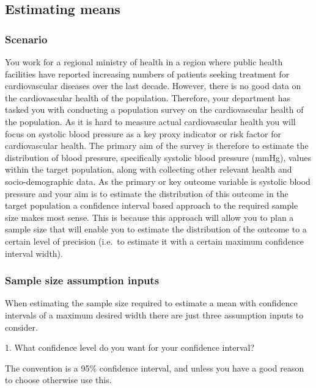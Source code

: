 \documentclass[
]{book}
\begin{document}
\hypertarget{estimating-means}{%
\subsection{Estimating means}\label{estimating-means}}

\hypertarget{scenario-3}{%
\subsubsection{Scenario}\label{scenario-3}}

You work for a regional ministry of health in a region where public health facilities have reported increasing numbers of patients seeking treatment for cardiovascular diseases over the last decade. However, there is no good data on the cardiovascular health of the population. Therefore, your department has tasked you with conducting a population survey on the cardiovascular health of the population. As it is hard to measure actual cardiovascular health you will focus on systolic blood pressure as a key proxy indicator or risk factor for cardiovascular health. The primary aim of the survey is therefore to estimate the distribution of blood pressure, specifically systolic blood pressure (mmHg), values within the target population, along with collecting other relevant health and socio-demographic data. As the primary or key outcome variable is systolic blood pressure and your aim is to estimate the distribution of this outcome in the target population a confidence interval based approach to the required sample size makes most sense. This is because this approach will allow you to plan a sample size that will enable you to estimate the distribution of the outcome to a certain level of precision (i.e.~to estimate it with a certain maximum confidence interval width).

\hypertarget{sample-size-assumption-inputs}{%
\subsubsection{Sample size assumption inputs}\label{sample-size-assumption-inputs}}

When estimating the sample size required to estimate a mean with confidence intervals of a maximum desired width there are just three assumption inputs to consider.

1. What confidence level do you want for your confidence interval?

The convention is a 95\% confidence interval, and unless you have a good reason to choose otherwise use this.
\end{document}
